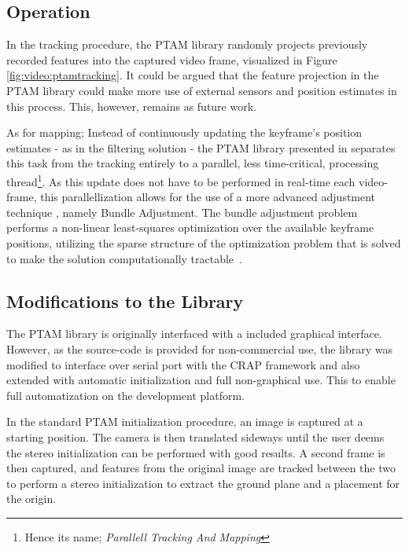        \subsection{Operation}
            In the tracking procedure, the PTAM library randomly projects previously recorded features into the
            captured video frame, visualized in Figure \ref{fig:video:ptamtracking}. It could be argued that the feature projection in the PTAM library
            could make more use of external sensors and position estimates in this process.
            This, however, remains as future work.

            As for mapping; Instead of continuously updating the keyframe's position estimates - as in the filtering solution -
            the PTAM library presented in \citep{klein07parallel} separates
            this task from the tracking entirely to a parallel, less time-critical, processing thread\footnote{Hence its name; \textit{Parallell Tracking And Mapping}}.
            As this update does not have to be performed in real-time each video-frame, this parallellization
            allows for the use of a more advanced adjustment technique \citep{klein07parallel}, namely
            Bundle Adjustment\citep{lour09}. The bundle adjustment problem
            performs a non-linear least-squares optimization over the available keyframe
            positions, utilizing the sparse structure of the optimization problem that
            is solved to make the solution computationally tractable~\citep{Lourakis11bundle}.

        \subsection{Modifications to the Library}
            The PTAM library is originally interfaced with a included graphical interface.
            However, as the source-code is provided for non-commercial use, the
            library was modified to interface over serial port with the CRAP framework
            and also extended with automatic initialization and full non-graphical use.
            This to enable full automatization on the development platform.

            In the standard PTAM initialization procedure, an image is captured
            at a starting position. The camera is then translated sideways until the user
            deems the stereo initialization can be performed with good results.
            A second frame is then captured, and features from the original image
            are tracked between the two to perform a stereo initialization to
            extract the ground plane and a placement for the origin.

